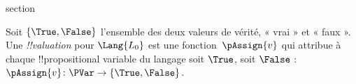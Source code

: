 \documentclass[11pt,a4paper,openany]{memoir}
\begin{document}
\endgroup



\begingroup
\expandafter\def\csname ol@sectioncs\endcsname{section}
\def\olfilename{valuations-sat}




\begin{defn}[!!^{valuation}s]
Soit $\{\True, \False\}$ l'ensemble des deux valeurs de vérité,
« vrai » et « faux ». Une \emph{!!{valuation}} pour $\Lang{L_0}$
est une fonction~$\pAssign{v}$ qui attribue à chaque
!!{propositional variable} du langage soit $\True$, soit $\False$ :
$\pAssign{v} \colon \PVar \to \{\True, \False\}$.
\end{defn}
\end{document}
